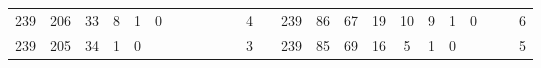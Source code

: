 {\begin{tabular}{cccccccccccclccccccccccc}
239                                                & 206                                                & 33                                               & 8                                                & 1                                                & 0                                                &                                                 &                                                 &                                                 &                                                 &                                                 & 4                                                &                          & 239                                                & 86                                                 & 67                                               & 19                                               & 10                                              & 9                                               & 1                                               & 0                                               &                                                 &                                                 & 6                                                \\
239                                                & 205                                                & 34                                               & 1                                                & 0                                                &                                                  &                                                 &                                                 &                                                 &                                                 &                                                 & 3                                                &                          & 239                                                & 85                                                 & 69                                               & 16                                               & 5                                               & 1                                               & 0                                               &                                                 &                                                 &                                                 & 5                                                \\

\end{tabular}}
